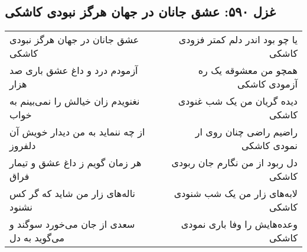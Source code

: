 \begin{center}
\section*{غزل ۵۹۰: عشق جانان در جهان هرگز نبودی کاشکی}
\label{sec:590}
\begin{longtable}{l p{0.5cm} r}
عشق جانان در جهان هرگز نبودی کاشکی
&&
یا چو بود اندر دلم کمتر فزودی کاشکی
\\
آزمودم درد و داغ عشق باری صد هزار
&&
همچو من معشوقه یک ره آزمودی کاشکی
\\
نغنویدم زان خیالش را نمی‌بینم به خواب
&&
دیده گریان من یک شب غنودی کاشکی
\\
از چه ننماید به من دیدار خویش آن دلفروز
&&
راضیم راضی چنان روی ار نمودی کاشکی
\\
هر زمان گویم ز داغ عشق و تیمار فراق
&&
دل ربود از من نگارم جان ربودی کاشکی
\\
ناله‌های زار من شاید که گر کس نشنود
&&
لابه‌های زار من یک شب شنودی کاشکی
\\
سعدی از جان می‌خورد سوگند و می‌گوید به دل
&&
وعده‌هایش را وفا باری نمودی کاشکی
\\
\end{longtable}
\end{center}

